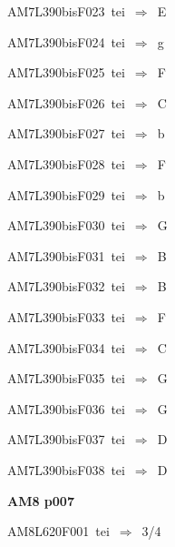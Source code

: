 {\sixrm AM7L390bisF023\ {\sixit tei}\ }$\Rightarrow$\ E\par\smallskip
{\sixrm AM7L390bisF024\ {\sixit tei}\ }$\Rightarrow$\ {\tenit g}\par\smallskip
{\sixrm AM7L390bisF025\ {\sixit tei}\ }$\Rightarrow$\ F\par\smallskip
{\sixrm AM7L390bisF026\ {\sixit tei}\ }$\Rightarrow$\ C\par\smallskip
{\sixrm AM7L390bisF027\ {\sixit tei}\ }$\Rightarrow$\ {\tenit b}\par\smallskip
{\sixrm AM7L390bisF028\ {\sixit tei}\ }$\Rightarrow$\ F\par\smallskip
{\sixrm AM7L390bisF029\ {\sixit tei}\ }$\Rightarrow$\ {\tenit b}\par\smallskip
{\sixrm AM7L390bisF030\ {\sixit tei}\ }$\Rightarrow$\ G\par\smallskip
{\sixrm AM7L390bisF031\ {\sixit tei}\ }$\Rightarrow$\ B\par\smallskip
{\sixrm AM7L390bisF032\ {\sixit tei}\ }$\Rightarrow$\ B\par\smallskip
{\sixrm AM7L390bisF033\ {\sixit tei}\ }$\Rightarrow$\ F\par\smallskip
{\sixrm AM7L390bisF034\ {\sixit tei}\ }$\Rightarrow$\ C\par\smallskip
{\sixrm AM7L390bisF035\ {\sixit tei}\ }$\Rightarrow$\ G\par\smallskip
{\sixrm AM7L390bisF036\ {\sixit tei}\ }$\Rightarrow$\ G\par\smallskip
{\sixrm AM7L390bisF037\ {\sixit tei}\ }$\Rightarrow$\ D\par\smallskip
{\sixrm AM7L390bisF038\ {\sixit tei}\ }$\Rightarrow$\ D\par\smallskip

\par\vfill\eject
{\bf\hfill AM8 p007\hfill\hbox{}}\par\bigskip
{\sixrm AM8L620F001\ {\sixit tei}\ }$\Rightarrow$\ 3/4\par\smallskip

